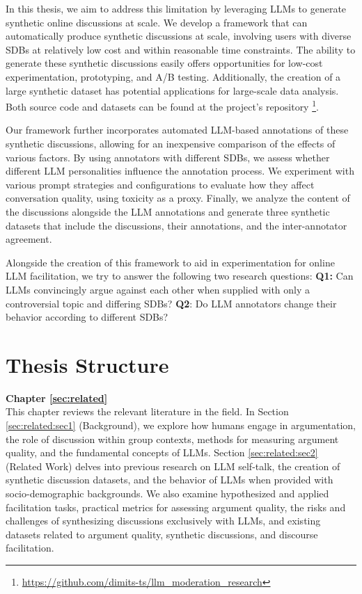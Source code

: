 In this thesis, we aim to address this limitation by leveraging \acp{LLM} to generate synthetic online discussions at scale. We develop a framework that can automatically produce synthetic discussions at scale, involving users with diverse \acp{SDB} at relatively low cost and within reasonable time constraints. The ability to generate these synthetic discussions easily offers opportunities for low-cost experimentation, prototyping, and A/B testing. Additionally, the creation of a large synthetic dataset has potential applications for large-scale data analysis. Both source code and datasets can be found at the project's repository \footnote{\url{https://github.com/dimits-ts/llm_moderation_research}}.

Our framework further incorporates automated LLM-based annotations of these synthetic discussions, allowing for an inexpensive comparison of the effects of various factors. By using annotators with different \acp{SDB}, we assess whether different LLM personalities influence the annotation process. We experiment with various prompt strategies and configurations to evaluate how they affect conversation quality, using toxicity as a proxy. Finally, we analyze the content of the discussions alongside the LLM annotations and generate three synthetic datasets that include the discussions, their annotations, and the inter-annotator agreement.

Alongside the creation of this framework to aid in experimentation for online LLM facilitation, we try to answer the following two research questions: \textbf{Q1:} Can LLMs convincingly argue against each other when supplied with only a controversial topic and differing \acp{SDB}? \textbf{Q2}: Do LLM annotators change their behavior according to different \acp{SDB}?

\section{Thesis Structure}
\label{sec:intro:structure}

\textbf{Chapter \ref{sec:related}} \\[0.2em]

This chapter reviews the relevant literature in the field. In Section \ref{sec:related:sec1} (Background), we explore how humans engage in argumentation, the role of discussion within group contexts, methods for measuring argument quality, and the fundamental concepts of \acp{LLM}. Section \ref{sec:related:sec2} (Related Work) delves into previous research on LLM self-talk, the creation of synthetic discussion datasets, and the behavior of LLMs when provided with socio-demographic backgrounds. We also examine hypothesized and applied facilitation tasks, practical metrics for assessing argument quality, the risks and challenges of synthesizing discussions exclusively with LLMs, and existing datasets related to argument quality, synthetic discussions, and discourse facilitation.


